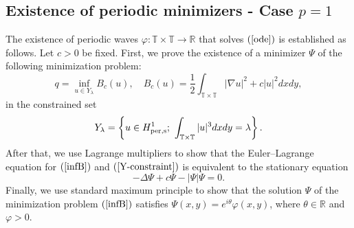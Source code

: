 \documentclass[12pt,reqno,a4paper]{amsart} %
\numberwithin{equation}{section}
\numberwithin{figure}{section}
\begin{document}
								
			
			\subsection{Existence of periodic minimizers - Case $p=1$}
			
		The existence of periodic waves $\varphi:\mathbb{T}\times\mathbb{T}\rightarrow \mathbb{R}$ that solves $(\ref{ode})$ is established as follows. Let $c>0$ be fixed. First, we prove the existence of a minimizer $\Psi$ of the following minimization problem:
			\begin{equation}
				\label{infB}
				q = \inf_{u\in Y_\lambda} B_c(u), \quad
				B_c(u) = \frac{1}{2}\int_{\mathbb{T}\times\mathbb{T}}|\nabla u|^2+c|u|^2 dxdy,
			\end{equation}
			in the constrained set
			\begin{equation}
				\label{Y-constraint}
				Y_{\lambda} = \left\{u\in H_{\rm per,s}^1;\ \int_{\mathbb{T}\times\mathbb{T}} |u|^3 dxdy = \lambda \right\}.
			\end{equation}
			\indent After that, we use Lagrange multipliers to show that the Euler--Lagrange equation for
			$(\ref{infB})$ and $(\ref{Y-constraint})$ is equivalent to the stationary equation 
			\begin{equation}\label{ode-wave}
			-\Delta \Psi+c\Psi -|\Psi|\Psi=0.	
				\end{equation}
			Finally, we use standard maximum principle to show that the solution $\Psi$ 
			of the minimization problem $(\ref{infB})$ satisfies $\Psi(x,y)=e^{i\theta}\varphi(x,y)$, where $\theta\in\mathbb{R}$ and $\varphi>0$. 
			
\end{document}
